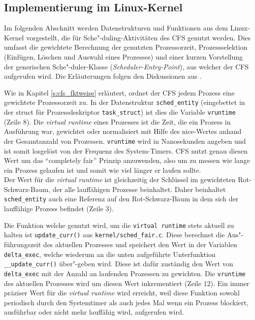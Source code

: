 \subsection{Implementierung im Linux-Kernel}\label{s:cstructs}
Im folgenden Abschnitt werden Datenstrukturen und Funktionen aus dem Linux-Kernel vorgestellt, die für Sche"-duling-Aktivitäten des CFS genutzt werden. Dies umfasst die gewichtete Berechnung der genutzten Prozessorzeit, Prozessselektion (Einfügen, Löschen und Auswahl eines Prozesses) und einer kurzen Vorstellung der generischen Sche"-duler-Klasse (\textit{Scheduler-Entry-Point}), aus welcher der CFS aufgerufen wird. Die Erläuterungen folgen den Diskussionen aus \cite{rlove}.

Wie in Kapitel \ref{s:cfs_fktweise} erläutert, ordnet der CFS jedem Prozess eine gewichtete Prozessorzeit zu. In der Datenstruktur \texttt{sched\_entity} (eingebettet in der struct für Prozessdeskriptor \texttt{task\_struct}) ist dies die Variable \texttt{vruntime} (Zeile 8). Die \textit{virtual runtime} eines Prozesses ist die Zeit, die ein Prozess in Ausführung war, gewichtet oder normalisiert mit Hilfe des nice-Wertes anhand der Gesamtanzahl von Prozessen. \texttt{vruntime} wird in Nanosekunden angeben und ist somit losgelöst von der Frequenz des System-Timers. CFS nutzt genau diesen Wert um das ``completely fair'' Prinzip anzuwenden, also um zu messen wie lange ein Prozess gelaufen ist und somit wie viel länger er laufen sollte. \\
Der Wert für die \textit{virtual runtime} ist gleichzeitig der Schlüssel im gewichteten Rot-Schwarz-Baum, der alle lauffähigen Prozesse beinhaltet. Daher beinhaltet \texttt{sched\_entity} auch eine Referenz auf den Rot-Schwarz-Baum in dem sich der lauffähige Prozess befindet (Zeile 3).


Die Funktion welche genutzt wird, um die  \texttt{virtual \- runtime} stets aktuell zu halten ist \texttt{update\_curr()} aus \texttt{kernel/sched\_fair.c}. Diese berechnet die Aus"-führungszeit des aktuellen Prozesses und speichert den Wert in der Variablen \texttt{delta\_exec}, welche wiederum an die unten aufgeführte Unterfunktion \texttt{\_\_update\_curr()} über"-geben wird. Diese ist dafür zuständig den Wert von \texttt{delta\-\_exec} mit der Anzahl an laufenden Prozessen zu gewichten. Die \texttt{vruntime} des aktuellen Prozesses wird um diesen Wert inkrementiert (Zeile 12). Ein immer präziser Wert für die \textit{virtual runtime} wird erreicht, weil diese Funktion sowohl periodisch durch den Systemtimer als auch jedes Mal wenn ein Prozess blockiert, ausführbar oder nicht mehr lauffähig wird, aufgerufen wird. 



